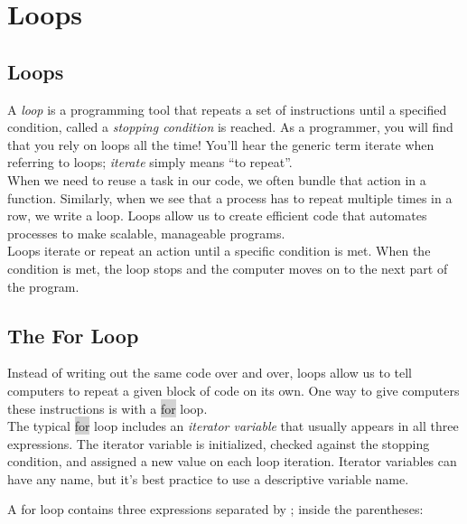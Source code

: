 \documentclass[11pt]{article}
\begin{document}
\newpage
\section{Loops}
\subsection{Loops}
A \textit{loop} is a programming tool that repeats a set of instructions until a specified condition, called a \textit{stopping condition} is reached. As a programmer, you will find that you rely on loops all the time! You’ll hear the generic term iterate when referring to loops; \textit{iterate} simply means “to repeat”. \\
\newline
When we need to reuse a task in our code, we often bundle that action in a function. Similarly, when we see that a process has to repeat multiple times in a row, we write a loop. Loops allow us to create efficient code that automates processes to make scalable, manageable programs. \\
\newline
Loops iterate or repeat an action until a specific condition is met. When the condition is met, the loop stops and the computer moves on to the next part of the program.

\subsection{The For Loop}
Instead of writing out the same code over and over, loops allow us to tell computers to repeat a given block of code on its own. One way to give computers these instructions is with a \colorbox{lightgray}{for} loop. \\
\newline
The typical \colorbox{lightgray}{for} loop includes an \textit{iterator variable} that usually appears in all three expressions. The iterator variable is initialized, checked against the stopping condition, and assigned a new value on each loop iteration. Iterator variables can have any name, but it’s best practice to use a descriptive variable name.

A for loop contains three expressions separated by ; inside the parentheses:
\end{document}
